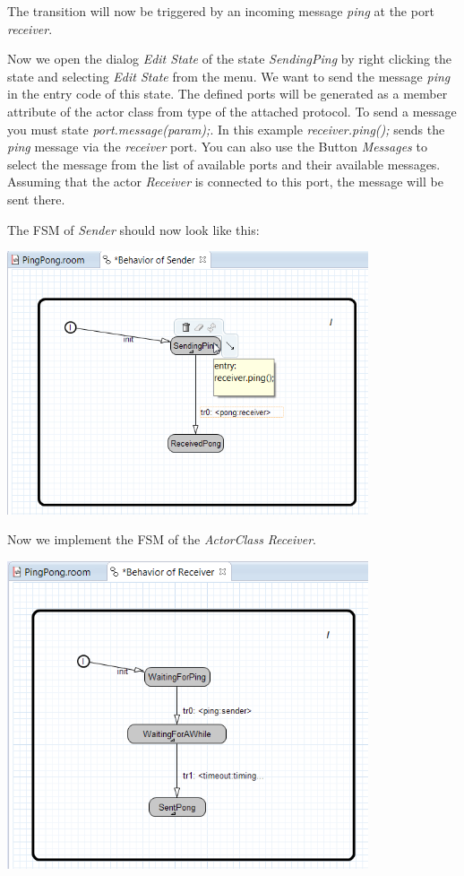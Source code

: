 The transition will now be triggered by an incoming message \emph{ping} at the port \emph{receiver}.

Now we open the dialog \emph{Edit State} of the state \textit{SendingPing} by right clicking the state and selecting \emph{Edit State} from the menu.
We want to send the message \emph{ping} in the entry code of this state.
The defined ports will be generated as a member attribute of the actor class from type of the attached 
protocol. To send a message you must state \textit{port.message(param);}. In this example 
\textit{receiver.ping();} sends the \textit{ping} message via the \textit{receiver} port. You can also use the Button \emph{Messages} to select the message from the list of available ports and their available messages.
Assuming that the actor \textit{Receiver} is connected to this port, the message will be sent there.

The FSM of \emph{Sender} should now look like this:

\includegraphics[width=0.8\textwidth]{images/017-11-FSM-Sender.png}

Now we implement the FSM of the \emph{ActorClass} \emph{Receiver}.

\includegraphics[width=0.8\textwidth]{images/017-12-FSM-Receiver.png}

